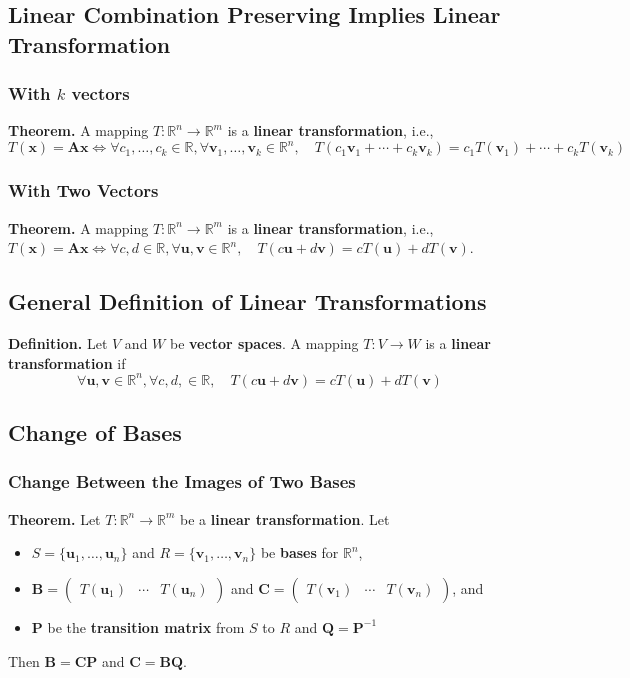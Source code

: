 \documentclass[../ma2001_notes.tex]{subfiles}
\begin{document}
\subsection{Linear Combination Preserving Implies Linear Transformation}
\subsubsection{With \(k\) vectors}
\textbf{Theorem.} A mapping \(T:\mathbb{R}^n\to\mathbb{R}^m\) is a \textbf{linear transformation}, i.e., \(T(\bm{x})=\bm{Ax}\Leftrightarrow\forall c_1,\ldots,c_k\in\mathbb{R},\forall\bm{v}_1,\ldots,\bm{v}_k\in\mathbb{R}^n,\quad T(c_1\bm{v}_1+\cdots+c_k\bm{v}_k)=c_1T(\bm{v}_1)+\cdots+c_kT(\bm{v}_k)\)

\subsubsection{With Two Vectors}
\textbf{Theorem.} A mapping \(T:\mathbb{R}^n\to\mathbb{R}^m\) is a \textbf{linear transformation}, i.e., \(T(\bm{x})=\bm{Ax}\Leftrightarrow\forall c,d\in\mathbb{R},\forall\bm{u},\bm{v}\in\mathbb{R}^n,\quad T(c\bm{u}+d\bm{v})=cT(\bm{u})+dT(\bm{v})\).

\subsection{General Definition of Linear Transformations}
\textbf{Definition.} Let \(V\) and \(W\) be \textbf{vector spaces}. A mapping \(T:V\to W\) is a \textbf{linear transformation} if
\[\forall\bm{u},\bm{v}\in\mathbb{R}^n,\forall c,d,\in\mathbb{R},\quad T(c\bm{u}+d\bm{v})=cT(\bm{u})+dT(\bm{v})\]

\subsection{Change of Bases}
\subsubsection{Change Between the Images of Two Bases}
\textbf{Theorem.} Let \(T:\mathbb{R}^n\to\mathbb{R}^m\) be a \textbf{linear transformation}. Let
\begin{itemize}
	\item\(S=\{\bm{u}_1,\ldots,\bm{u}_n\}\) and \(R=\{\bm{v}_1,\ldots,\bm{v}_n\}\) be \textbf{bases} for \(\mathbb{R}^n\),
	\item\(\bm{B}=\begin{pmatrix}
	T(\bm{u}_1) & \cdots & T(\bm{u}_n)
\end{pmatrix}\) and \(\bm{C}=\begin{pmatrix}
	T(\bm{v}_1) & \cdots & T(\bm{v}_n)
\end{pmatrix}\), and
	\item\(\bm{P}\) be the \textbf{transition matrix} from \(S\) to \(R\) and \(\bm{Q}=\bm{P}^{-1}\)
\end{itemize}
Then \(\bm{B}=\bm{CP}\) and \(\bm{C}=\bm{BQ}\).
\end{document}
